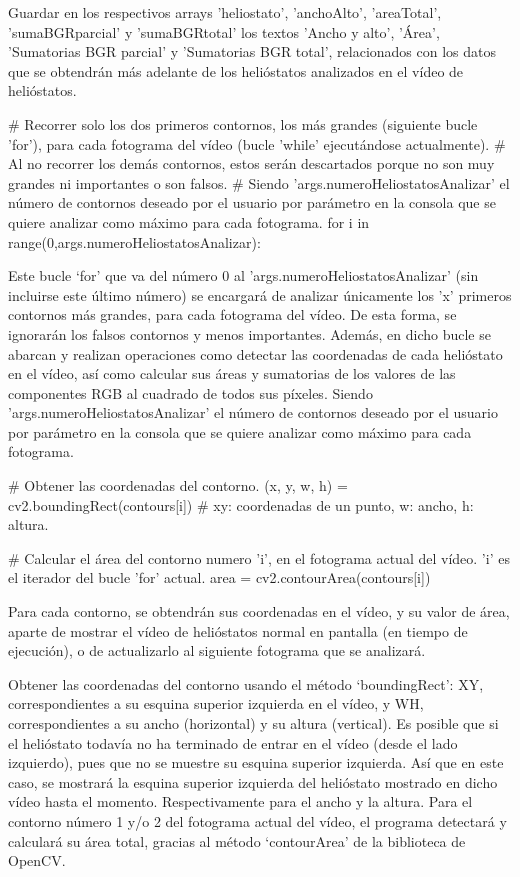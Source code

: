 \documentclass[12pt]{article}
\begin{document}
    Guardar en los respectivos arrays 'heliostato', 'anchoAlto', 'areaTotal', 'sumaBGRparcial' y 'sumaBGRtotal' los textos 'Ancho y alto', 'Área', 'Sumatorias BGR parcial' y 'Sumatorias BGR total', relacionados con los datos que se obtendrán más adelante de los helióstatos analizados en el vídeo de helióstatos.


    \# Recorrer solo los dos primeros contornos, los más grandes (siguiente bucle 'for'), para cada fotograma del vídeo (bucle 'while' ejecutándose actualmente).
    \# Al no recorrer los demás contornos, estos serán descartados porque no son muy grandes ni importantes o son falsos.
    \# Siendo 'args.numeroHeliostatosAnalizar' el número de contornos deseado por el usuario por parámetro en la consola que se quiere analizar como máximo para cada fotograma.
    for i in range(0,args.numeroHeliostatosAnalizar):

Este bucle ‘for’ que va del número 0 al 'args.numeroHeliostatosAnalizar' (sin incluirse este último número) se encargará de analizar únicamente los 'x' primeros contornos más grandes, para cada fotograma del vídeo. De esta forma, se ignorarán los falsos contornos y menos importantes. Además, en dicho bucle se abarcan y realizan operaciones como detectar las coordenadas de cada helióstato en el vídeo, así como calcular sus áreas y sumatorias de los valores de las componentes RGB al cuadrado de todos sus píxeles. Siendo 'args.numeroHeliostatosAnalizar' el número de contornos deseado por el usuario por parámetro en la consola que se quiere analizar como máximo para cada fotograma.
        
        
        \# Obtener las coordenadas del contorno.
        (x, y, w, h) = cv2.boundingRect(contours[i]) \# xy: coordenadas de un punto, w: ancho, h: altura.

        \# Calcular el área del contorno numero 'i', en el fotograma actual del vídeo. 'i' es el iterador del bucle 'for' actual.
        area = cv2.contourArea(contours[i])
        
Para cada contorno, se obtendrán sus coordenadas en el vídeo, y su valor de área, aparte de mostrar el vídeo de helióstatos normal en pantalla (en tiempo de ejecución), o de actualizarlo al siguiente fotograma que se analizará.

Obtener las coordenadas del contorno usando el método ‘boundingRect’: XY, correspondientes a su esquina superior izquierda en el vídeo, y WH, correspondientes a su ancho (horizontal) y su altura (vertical). Es posible que si el helióstato todavía no ha terminado de entrar en el vídeo (desde el lado izquierdo), pues que no se muestre su esquina superior izquierda. Así que en este caso, se mostrará la esquina superior izquierda del helióstato mostrado en dicho vídeo hasta el momento. Respectivamente para el ancho y la altura.
Para el contorno número 1 y/o 2 del fotograma actual del vídeo, el programa detectará y calculará su área total, gracias al método ‘contourArea’ de la biblioteca de OpenCV.
\end{document}
